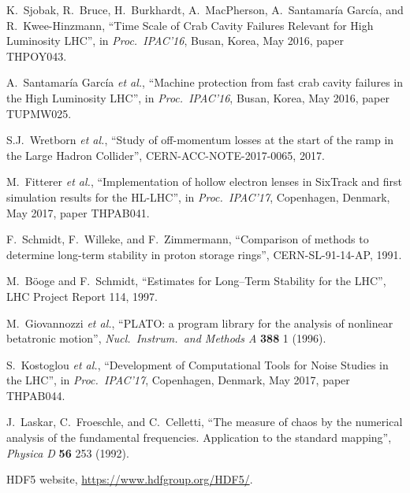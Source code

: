 \documentclass[a4paper,
              ]{jacow}
\begin{document}
\begin{thebibliography}{99}
K.~Sjobak, R.~Bruce, H.~Burkhardt, A.~MacPherson, A.~Santamaría García, and R.~Kwee-Hinzmann, ``Time Scale of Crab Cavity Failures Relevant for High Luminosity LHC'', in {\it Proc.~IPAC’16}, Busan, Korea, May 2016, paper THPOY043.

A.~Santamaría García {\it et al.},
``Machine protection from fast crab cavity failures in the High Luminosity LHC'', in {\it Proc.~IPAC’16}, Busan, Korea, May 2016, paper TUPMW025.
 
S.J.\ Wretborn {\it et al.}, ``Study of off-momentum losses at the start of the ramp in the Large Hadron Collider'', CERN-ACC-NOTE-2017-0065, 2017.

M.~Fitterer {\it et al.},
``Implementation of hollow electron lenses in SixTrack and first simulation results for the HL-LHC'', in {\it Proc.~IPAC’17}, Copenhagen, Denmark, May 2017, paper THPAB041.


F.~Schmidt, F.~Willeke, and F.~Zimmermann, ``Comparison of methods to determine long-term stability in proton storage rings'', CERN-SL-91-14-AP, 1991. 

M.~B\"ooge and F.~Schmidt, ``{Estimates for Long–Term Stability for the LHC}'', LHC Project Report 114, 1997.

M.~Giovannozzi {\it et al.}, ``PLATO: a program library for the analysis of nonlinear betatronic motion'', {\it Nucl.\ Instrum.\ and Methods A} {\bf 388} 1 (1996).

S.~Kostoglou {\it et al.}, ``Development of Computational Tools for Noise Studies in the LHC'', in \emph{Proc.~IPAC'17}, Copenhagen, Denmark, May 2017, paper THPAB044.

J.~Laskar, C.~Froeschle, and C.~Celletti, ``The measure of chaos by the numerical analysis of the fundamental frequencies. Application to the standard mapping'', \emph{Physica D} {\bf 56} 253 (1992).

 HDF5 website,
\url{https://www.hdfgroup.org/HDF5/}.


\end{thebibliography}
\end{document}
